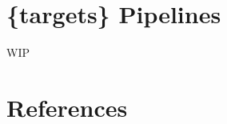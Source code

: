 \documentclass[
  letterpaper,
  DIV=11,
  numbers=noendperiod]{scrreprt}
\newlength{\cslhangindent}
\newenvironment{CSLReferences}[2] %
 {\begin{list}{}{%
  \setlength{\itemindent}{0pt}
  \setlength{\leftmargin}{0pt}
  \setlength{\parsep}{0pt}
  \ifodd #1
   \setlength{\leftmargin}{\cslhangindent}
   \setlength{\itemindent}{-1\cslhangindent}
  \fi
  \setlength{\itemsep}{#2\baselineskip}}}
 {\end{list}}
\begin{document}

\chapter{\{targets\} Pipelines}\label{targets-pipelines}

WIP


\chapter*{References}\label{references}


\label{refs}
\begin{CSLReferences}{0}{1}
\end{CSLReferences}
\end{document}
